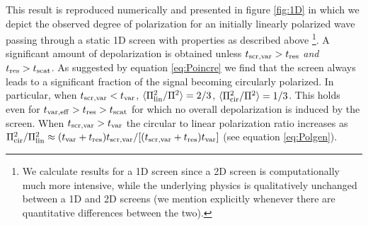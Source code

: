 \documentclass[fleqn,usenatbib]{mnras}
\begin{document}
	This result is reproduced numerically and presented in figure \ref{fig:1D} in which we depict the observed degree of polarization for an initially linearly polarized wave passing through a static 1D screen with properties as described above \footnote{We calculate results for a 1D screen since a 2D screen is computationally much more intensive, while the underlying physics is qualitatively unchanged between a 1D and 2D screens (we mention explicitly whenever there are quantitative differences between the two).}. A significant amount of depolarization is obtained unless $t_{\rm scr,var}>t_{\rm res}$ {\it and} $t_{\rm res}> t_{\rm scat}$. As suggested by equation \ref{eq:Poincre} we find that the screen always leads to a significant fraction of the signal becoming circularly polarized. In particular, when $t_{\rm scr,var}<t_{\rm var}$, $\langle \Pi_{\rm lin}^2/\Pi^2\rangle=2/3$, $\langle \Pi_{\rm cir}^2/\Pi^2\rangle=1/3$. This holds even for $t_{\rm var, eff}>t_{\rm res}>t_{\rm scat}$ for which no overall depolarization is induced by the screen. When $t_{\rm scr,var}>t_{\rm var}$ the circular to linear polarization ratio increases as $\Pi_{\rm cir}^2/\Pi_{\rm lin}^2\approx (t_{\rm var}+t_{\rm res})t_{\rm scr,var}/[(t_{\rm scr,var}+t_{\rm res})t_{\rm var}]$ (see equation \ref {eq:Polgen}).
	
\end{document}
